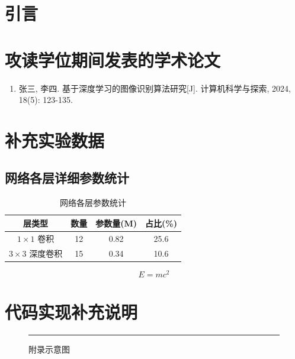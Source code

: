 \documentclass{sduthesis}
\begin{document}
\START
\chapter{引言}

\begin{myappendix}
\chapter{攻读学位期间发表的学术论文}


\begin{enumerate}
    \item 张三, 李四. 基于深度学习的图像识别算法研究[J]. 计算机科学与探索, 2024, 18(5): 123-135.
\end{enumerate}

\chapter{补充实验数据}

\section{网络各层详细参数统计}

\begin{table}[htbp]
    \centering
    \caption{网络各层参数统计}
    \begin{tabular}{cccc}
        \toprule
        \textbf{层类型} & \textbf{数量} & \textbf{参数量(M)} & \textbf{占比(\%)} \\
        \midrule
        $1\times1$ 卷积 & 12 & 0.82 & 25.6 \\
        $3\times3$ 深度卷积 & 15 & 0.34 & 10.6 \\
        \bottomrule
    \end{tabular}
    \label{tab:layer_params}
\end{table}


\begin{equation}
    E = mc^2
\end{equation}

\chapter{代码实现补充说明}


\begin{figure}[htbp]
    \centering
    \rule{2cm}{1cm}
    \caption{附录示意图}
    \label{fig:appendix}
\end{figure}


\end{myappendix}
\END
\end{document}
